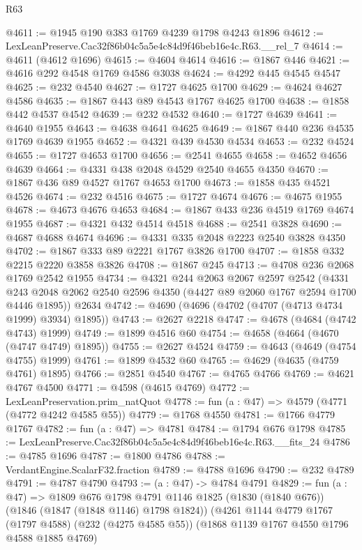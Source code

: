 \begin{lexlean}{R63}
\begin{coremodule}
@4611 := @1945 @190 @383 @1769 @4239 @1798 @4243 @1896
@4612 := LexLeanPreserve.Cac32f86b04c5a5e4c84d9f46beb16e4c.R63.__rel_7
@4614 := @4611 (@4612 @1696)
@4615 := @4604 @4614
@4616 := @1867 @446
@4621 := @4616 @292 @4548 @1769 @4586 @3038
@4624 := @4292 @445 @4545 @4547
@4625 := @232 @4540
@4627 := @1727 @4625 @1700
@4629 := @4624 @4627 @4586
@4635 := @1867 @443 @89 @4543 @1767 @4625 @1700
@4638 := @1858 @442 @4537 @4542
@4639 := @232 @4532
@4640 := @1727 @4639
@4641 := @4640 @1955
@4643 := @4638 @4641 @4625
@4649 := @1867 @440 @236 @4535 @1769 @4639 @1955
@4652 := @4321 @439 @4530 @4534
@4653 := @232 @4524
@4655 := @1727 @4653 @1700
@4656 := @2541 @4655
@4658 := @4652 @4656 @4639
@4664 := @4331 @438 @2048 @4529 @2540 @4655 @4350
@4670 := @1867 @436 @89 @4527 @1767 @4653 @1700
@4673 := @1858 @435 @4521 @4526
@4674 := @232 @4516
@4675 := @1727 @4674
@4676 := @4675 @1955
@4678 := @4673 @4676 @4653
@4684 := @1867 @433 @236 @4519 @1769 @4674 @1955
@4687 := @4321 @432 @4514 @4518
@4688 := @2541 @3828
@4690 := @4687 @4688 @4674
@4696 := @4331 @335 @2048 @2223 @2540 @3828 @4350
@4702 := @1867 @333 @89 @2221 @1767 @3826 @1700
@4707 := @1858 @332 @2215 @2220 @3858 @3826
@4708 := @1867 @245
@4713 := @4708 @236 @2068 @1769 @2542 @1955
@4734 := @4321
    @244
    @2063
    @2067
    @2597
    @2542
    (@4331 @243 @2048 @2062 @2540 @2596 @4350 (@4427 @89 @2060 @1767 @2594 @1700 @4446 @1895))
    @2634
@4742 := @4690 (@4696 (@4702 (@4707 (@4713 @4734 @1999) @3934) @1895))
@4743 := @2627 @2218
@4747 := @4678 (@4684 (@4742 @4743) @1999)
@4749 := @1899 @4516 @60
@4754 := @4658 (@4664 (@4670 (@4747 @4749) @1895))
@4755 := @2627 @4524
@4759 := @4643 (@4649 (@4754 @4755) @1999)
@4761 := @1899 @4532 @60
@4765 := @4629 (@4635 (@4759 @4761) @1895)
@4766 := @2851 @4540
@4767 := @4765 @4766
@4769 := @4621 @4767 @4500
@4771 := @4598 (@4615 @4769)
@4772 := LexLeanPreservation.prim_natQuot
@4778 := fun (a : @47) => @4579 (@4771 (@4772 @4242 @4585 @55))
@4779 := @1768 @4550
@4781 := @1766 @4779 @1767
@4782 := fun (a : @47) => @4781
@4784 := @1794 @676 @1798
@4785 := LexLeanPreserve.Cac32f86b04c5a5e4c84d9f46beb16e4c.R63.__fits_24
@4786 := @4785 @1696
@4787 := @1800 @4786
@4788 := VerdantEngine.ScalarF32.fraction
@4789 := @4788 @1696
@4790 := @232 @4789
@4791 := @4787 @4790
@4793 := (a : @47) -> @4784 @4791
@4829 := fun (a : @47) =>
  @1809
    @676
    @1798
    @4791
    @1146
    @1825
    (@1830 (@1840 @676))
    (@1846 (@1847 (@1848 @1146) @1798 @1824))
    (@4261
      @1144
      @4779
      @1767
      (@1797 @4588)
      (@232 (@4275 @4585 @55))
      (@1868 @1139 @1767 @4550 @1796 @4588 @1885 @4769)

\end{coremodule}
\end{lexlean}
